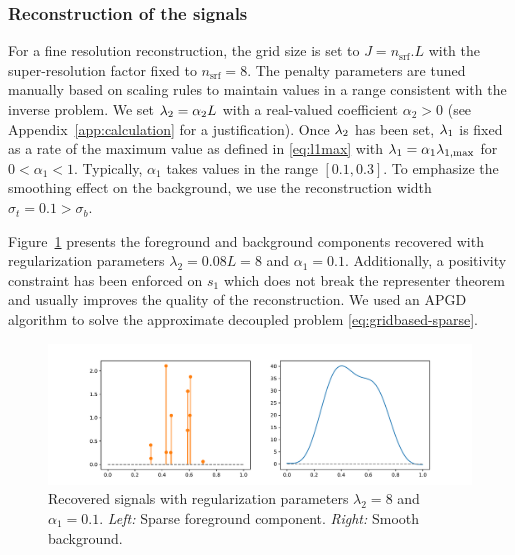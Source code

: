 \documentclass[12pt]{article}
\begin{document}
        \subsubsection{Reconstruction of the signals}
        For a fine resolution reconstruction, the grid size is set to $J = n_\mathrm{srf} . L$ with the super-resolution factor fixed to $n_\mathrm{srf}=8$. The penalty parameters are tuned manually based on scaling rules to maintain values in a range consistent with the inverse problem. We set $\lambda_{2} = \alpha_2 L$ with a real-valued coefficient $\alpha_2 >0$ (see Appendix~\ref{app:calculation} for a justification).
        Once $\lambda_{2}$ has been set, $\lambda_{1}$ is fixed as a rate of the maximum value as defined in \eqref{eq:l1max} with $\lambda_{1} = \alpha_1 \lambda_{1, \mathrm{max}}$ for $0 < \alpha_1 <1$. Typically, $\alpha_1$ takes values in the range $[0.1, 0.3]$. To emphasize the smoothing effect on the background, we use the reconstruction width $\sigma_t = 0.1 > \sigma_b$.

        Figure~\ref{fig:simple:recos} presents the foreground and background components recovered with regularization parameters $\lambda_2 = 0.08 L =8$ and $\alpha_1 = 0.1$. Additionally, a positivity constraint has been enforced on $s_1$ which does not break the representer theorem and usually improves the quality of the reconstruction. We used an APGD algorithm \cite{liang2022improving} to solve the approximate decoupled problem \eqref{eq:gridbased-sparse}.

        \begin{figure}[t]
            \centering
            \includegraphics[width=\linewidth]{figures/simple_reco/recos.pdf}
            \caption{Recovered signals with regularization parameters $\lambda_2 = 8$ and $\alpha_1 = 0.1$. \textit{Left:} Sparse foreground component. \textit{Right:} Smooth background.}
            \label{fig:simple:recos}
        \end{figure}
\end{document}
